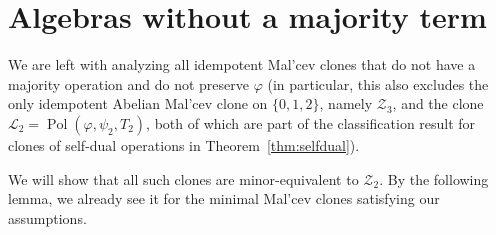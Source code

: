 \documentclass[12pt]{amsart}
\theoremstyle{definition}
\theoremstyle{definition}
\newcommand{\clo}[1]{\mathcal{#1}}
\DeclareMathOperator{\Pol}{Pol}
\begin{document}
\section{Algebras without a majority term}\label{sec:NotSDmeet}

We are left with analyzing all idempotent Mal'cev clones that do not have a majority operation and do not preserve $\varphi$ (in particular, this also excludes the only idempotent Abelian Mal'cev clone on $\{0,1,2\}$, namely $\mathcal Z_3$, and the clone $\mathcal L_2 = \Pol(\varphi,\psi_2,T_2)$, both of which are part of the classification result for clones of self-dual operations in Theorem~\ref{thm:selfdual}).

We will show that all such clones are minor-equivalent to $\clo{Z}_2$. By the following lemma, we already see it for the minimal Mal'cev clones satisfying our assumptions.
\end{document}
